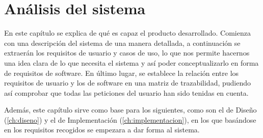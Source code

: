 \chapter{Análisis del sistema}
\label{ch:analisis}
En este capítulo se explica de qué es capaz el producto desarrollado. Comienza con una descripción del sistema de una manera detallada, a continuación se extraerán los requisitos de usuario y casos de uso, lo que nos permite hacernos una idea clara de lo que necesita el sistema y así poder conceptualizarlo en forma de requisitos de software. En último lugar, se establece la relación entre los requisitos de usuario y los de software en una matriz de trazabilidad, pudiendo así comprobar que todas las peticiones del usuario han sido tenidas en cuenta.

Además, este capítulo sirve como base para los siguientes, como son el de Diseño (\autoref{ch:diseno}) y el de Implementación (\autoref{ch:implementacion}), en los que basándose en los requisitos recogidos se empezara a dar forma al sistema.

